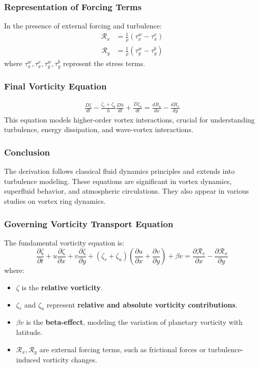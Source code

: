 \documentclass[12pt]{article}
\begin{document}
    \subsubsection*{Representation of Forcing Terms}
    In the presence of external forcing and turbulence:
    \begin{align}
        \mathcal{R}_x &= \frac{1}{\rho}(\tau_x^w - \tau_x^v)
    \end{align}
    \begin{align}
        \mathcal{R}_y &= \frac{1}{\rho}(\tau_y^w - \tau_y^b)
    \end{align}
    where $\tau_x^w, \tau_x^v, \tau_y^w, \tau_y^b$ represent the stress terms.

    \subsubsection*{Final Vorticity Equation}
    \begin{align}
        \frac{D \zeta}{d t}-\frac{\zeta_r+\zeta_a}{h} \frac{D h}{d t}+\frac{D \zeta_a}{d t}=\frac{d R_u}{d x}-\frac{d R_x}{d y}
    \end{align}
    This equation models higher-order vortex interactions, crucial for understanding turbulence, energy dissipation, and wave-vortex interactions.

    \subsubsection*{Conclusion}
    The derivation follows classical fluid dynamics principles and extends into turbulence modeling. These equations are significant in vortex dynamics, superfluid behavior, and atmospheric circulations. They also appear in various studies on vortex ring dynamics.

    \subsubsection*{Governing Vorticity Transport Equation}
    The fundamental vorticity equation is:
    \begin{equation*}
        \frac{\partial \zeta}{\partial t} + u \frac{\partial \zeta}{\partial x} + v \frac{\partial \zeta}{\partial y} + \left( \zeta_r + \zeta_a \right) \left( \frac{\partial u}{\partial x} + \frac{\partial v}{\partial y} \right) + \beta v = \frac{\partial \mathcal{R}_v}{\partial x} - \frac{\partial \mathcal{R}_x}{\partial y}
    \end{equation*}
    where:
    \begin{itemize}
        \item $\zeta$ is the \textbf{relative vorticity}.
        \item $\zeta_r$ and $\zeta_a$ represent \textbf{relative and absolute vorticity contributions}.
        \item $\beta v$ is the \textbf{beta-effect}, modeling the variation of planetary vorticity with latitude.
        \item $\mathcal{R}_x, \mathcal{R}_y$ are external forcing terms, such as frictional forces or turbulence-induced vorticity changes.
    \end{itemize}
\end{document}
